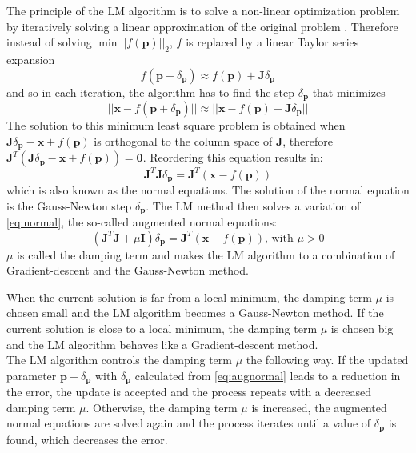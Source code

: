 The principle of the \ac{LM} algorithm is to solve a non-linear optimization problem by iteratively solving a linear approximation of the original problem \cite{Dahmen2013}. Therefore instead of solving $\min ||f(\mathbf{p})||_2$, $f$ is replaced by a linear Taylor series expansion
\begin{equation} 
  f(\mathbf{p} + \delta_{\mathbf{p}}) \approx f(\mathbf{p}) + \mathbf{J} \delta_{\mathbf{p}}
\end{equation}
and so in each iteration, the algorithm has to find the step $\delta_{\mathbf{p}}$ that minimizes
\begin{equation} 
  || \mathbf{x} - f(\mathbf{p} + \delta_{\mathbf{p}})|| \approx ||\mathbf{x} - f(\mathbf{p}) - \mathbf{J} \delta_{\mathbf{p}}||
\end{equation}
The solution to this minimum least square problem is obtained when $\mathbf{J}\delta_{\mathbf{p}} - \mathbf{x} + f(\mathbf{p})$ is orthogonal to the column space of $\mathbf{J}$, therefore $\mathbf{J}^T(\mathbf{J} \delta_{\mathbf{p}} - \mathbf{x} + f(\mathbf{p})) = \mathbf{0}$. Reordering this equation results in: 
\begin{equation} 
  \mathbf{J}^T\mathbf{J}\delta_{\mathbf{p}} = \mathbf{J}^T(\mathbf{x} - f(\mathbf{p}))
  \label{eq:normal}
\end{equation}
which is also known as the normal equations. The solution of the normal equation is the Gauss-Newton step $\delta_{\mathbf{p}}$.
The \ac{LM} method then solves a variation of \autoref{eq:normal}, the so-called augmented normal equations:
\begin{equation} 
  (\mathbf{J}^T\mathbf{J} + \mu \mathbf{I})\delta_{\mathbf{p}} = \mathbf{J}^T(\mathbf{x} -f(\mathbf{p})) \text{, with } \mu > 0
  \label{eq:augnormal}
\end{equation}
$\mu$ is called the damping term and makes the \ac{LM} algorithm to a combination of Gradient-descent and the Gauss-Newton method.

When the current solution is far from a local minimum, the damping term $\mu$ is chosen small and the \ac{LM} algorithm becomes a Gauss-Newton method. If the current solution is close to a local minimum, the damping term $\mu$ is chosen big and the \ac{LM} algorithm behaves like a Gradient-descent method.\\

The \ac{LM} algorithm controls the damping term $\mu$ the following way. If the updated parameter $\mathbf{p} + \delta_{\mathbf{p}}$ with $\delta_{\mathbf{p}}$ calculated from \autoref{eq:augnormal} leads to a reduction in the error, the update is accepted and the process repeats with a decreased damping term $\mu$. Otherwise, the damping term $\mu$ is increased, the augmented normal equations are solved again and the process iterates until a value of $\delta_{\mathbf{p}}$ is found, which decreases the error.\\

